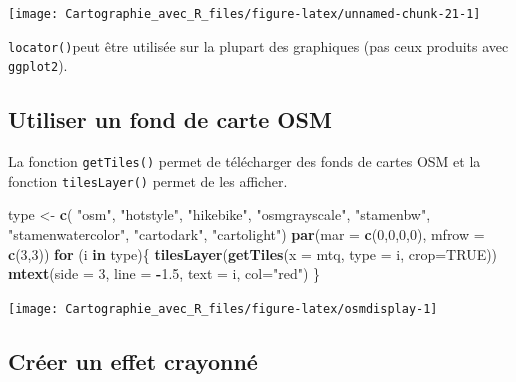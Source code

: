 \documentclass[]{book}
\newenvironment{Shaded}{\begin{snugshade}}{\end{snugshade}}
\newcommand{\KeywordTok}[1]{\textcolor[rgb]{0.13,0.29,0.53}{\textbf{#1}}}
\newcommand{\DataTypeTok}[1]{\textcolor[rgb]{0.13,0.29,0.53}{#1}}
\newcommand{\DecValTok}[1]{\textcolor[rgb]{0.00,0.00,0.81}{#1}}
\newcommand{\FloatTok}[1]{\textcolor[rgb]{0.00,0.00,0.81}{#1}}
\newcommand{\StringTok}[1]{\textcolor[rgb]{0.31,0.60,0.02}{#1}}
\newcommand{\OtherTok}[1]{\textcolor[rgb]{0.56,0.35,0.01}{#1}}
\newcommand{\ControlFlowTok}[1]{\textcolor[rgb]{0.13,0.29,0.53}{\textbf{#1}}}
\newcommand{\OperatorTok}[1]{\textcolor[rgb]{0.81,0.36,0.00}{\textbf{#1}}}
\newcommand{\NormalTok}[1]{#1}
\begin{document}
\begin{center}\texttt{[image: Cartographie\_avec\_R\_files/figure-latex/unnamed-chunk-21-1]} \end{center}

\texttt{locator()}peut être utilisée sur la plupart des graphiques (pas
ceux produits avec \texttt{ggplot2}).

\subsection{Utiliser un fond de carte
OSM}\label{utiliser-un-fond-de-carte-osm}

La fonction \texttt{getTiles()} permet de télécharger des fonds de
cartes OSM et la fonction \texttt{tilesLayer()} permet de les afficher.

\begin{Shaded}
\begin{Highlighting}[]
\NormalTok{type <-}\StringTok{ }\KeywordTok{c}\NormalTok{( }\StringTok{"osm"}\NormalTok{, }\StringTok{"hotstyle"}\NormalTok{,  }\StringTok{"hikebike"}\NormalTok{, }\StringTok{"osmgrayscale"}\NormalTok{, }\StringTok{"stamenbw"}\NormalTok{,}
           \StringTok{"stamenwatercolor"}\NormalTok{, }\StringTok{"cartodark"}\NormalTok{, }\StringTok{"cartolight"}\NormalTok{)}
\KeywordTok{par}\NormalTok{(}\DataTypeTok{mar =} \KeywordTok{c}\NormalTok{(}\DecValTok{0}\NormalTok{,}\DecValTok{0}\NormalTok{,}\DecValTok{0}\NormalTok{,}\DecValTok{0}\NormalTok{), }\DataTypeTok{mfrow =} \KeywordTok{c}\NormalTok{(}\DecValTok{3}\NormalTok{,}\DecValTok{3}\NormalTok{))}
\ControlFlowTok{for}\NormalTok{ (i }\ControlFlowTok{in}\NormalTok{ type)\{}
  \KeywordTok{tilesLayer}\NormalTok{(}\KeywordTok{getTiles}\NormalTok{(}\DataTypeTok{x =}\NormalTok{ mtq, }\DataTypeTok{type =}\NormalTok{ i, }\DataTypeTok{crop=}\OtherTok{TRUE}\NormalTok{))}
  \KeywordTok{mtext}\NormalTok{(}\DataTypeTok{side =} \DecValTok{3}\NormalTok{, }\DataTypeTok{line =} \OperatorTok{-}\FloatTok{1.5}\NormalTok{, }\DataTypeTok{text =}\NormalTok{ i, }\DataTypeTok{col=}\StringTok{"red"}\NormalTok{)}
\NormalTok{\}}
\end{Highlighting}
\end{Shaded}

\begin{center}\texttt{[image: Cartographie\_avec\_R\_files/figure-latex/osmdisplay-1]} \end{center}

\subsection{Créer un effet crayonné}\label{creer-un-effet-crayonne}
\end{document}
